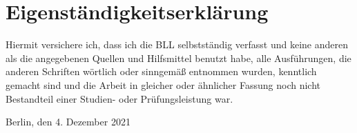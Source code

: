 \newpage



\printbibliography
\newpage
%


\newpage
\section*{Eigenständigkeitserklärung}


Hiermit versichere ich, dass ich die BLL selbstständig verfasst und keine anderen als die angegebenen Quellen und Hilfsmittel benutzt habe, alle Ausführungen, die anderen Schriften wörtlich oder sinngemäß entnommen wurden, kenntlich gemacht sind und die Arbeit in gleicher oder ähnlicher Fassung noch nicht Bestandteil einer Studien- oder Prüfungsleistung war.

\noindent{}Berlin, den 4. Dezember 2021
\begin{minipage}[t]{8cm}
\centering \hspace{20mm} \hrulefill \\
\end{minipage}